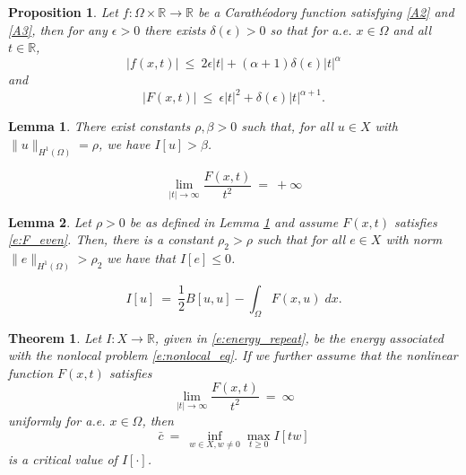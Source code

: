 \documentclass[10pt,a4paper]{amsart}
\newtheorem{proposition}{Proposition}
\newtheorem{lemma}{Lemma}
\newtheorem{theorem}{Theorem}
\newcommand{\JMS}[1]{{\color{orange} {\bf J. Siktar:} [#1] }}
\def\Om{\Omega}
\def\R{\mathbb{R}}
\def\al{\alpha}
\def\be{\beta}
\def\de{\delta}
\def\ep{\epsilon}
\def\grad{\nabla}
\begin{document}
\begin{proposition}\label{Prop: fB}
    Let $f: \Om \times \R \rightarrow \R$ be a Carathéodory function satisfying \ref{A2} and \ref{A3}, then for any $\ep > 0$ there exists $\de(\ep) > 0$ so that for a.e. $x \in \Om$ and all $t \in \R$,
    \begin{equation}\label{Eq: fB}
        |f(x, t)| \ \leq \ 2\ep|t| + (\al + 1)\de(\ep)|t|^{\al}
    \end{equation}
        and
    \begin{equation}\label{Eq: FB}
        |F(x, t)| \ \leq \ \ep|t|^2 + \de(\ep)|t|^{\al + 1}.
    \end{equation}
    \end{proposition}

\begin{lemma}\label{Lem: theRingLemma}
    There exist constants $\rho, \be > 0$ such that, for all $u \in X$ with 
    $\| u\|_{H^1(\Omega)} = \rho$,
    we have $I[u] > \be$.
\end{lemma}

  \begin{equation}\label{e:F_even}
    \lim_{|t| \rightarrow \infty}\frac{F(x, t)}{t^2} \ = \ +\infty
    \end{equation}

 \begin{lemma}\label{Lem: coercivityLemH^1_v2}
Let $\rho > 0$ be as defined in Lemma \ref{Lem: theRingLemma} and 
assume $F(x,t)$ satisfies \eqref{e:F_even}. Then, there is a constant $\rho_2>\rho$
such that for all $e \in X$ with norm $\| e\|_{H^1(\Omega)} > \rho_2$ we have that $I[e] \leq 0$.
\end{lemma}

\begin{equation}\label{e:energy_repeat}
 I[u] \ = \ \frac{1}{2} B[u,u] - \int_\Omega F(x,u) \;dx.
 \end{equation}

\begin{theorem}\label{t:existence_2}
Let $I: X \longrightarrow \R$, given in \eqref{e:energy_repeat}, be the energy associated with the nonlocal problem \eqref{e:nonlocal_eq}. If we further assume that the nonlinear function $F(x,t)$ satisfies
\begin{equation}\label{a:F}
 \lim_{|t| \to \infty} \frac{F(x,t)}{t^2} \ = \ \infty
 \end{equation}
uniformly for a.e. $ x\in \Omega$, then
\[ \bar{c} \ = \ \inf_{w \in X, w\neq 0} \max_{t\geq 0} I[tw]\]
is a critical value of $I[\cdot]$.
\end{theorem}
\end{document}
